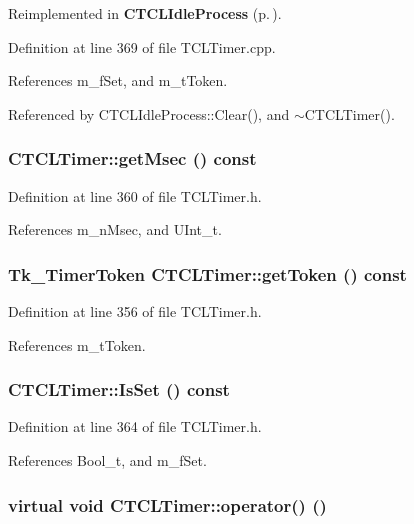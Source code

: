 Reimplemented in {\bf CTCLIdle\-Process} {\rm (p.\,\pageref{classCTCLIdleProcess_a5})}.

Definition at line 369 of file TCLTimer.cpp.

References m\_\-f\-Set, and m\_\-t\-Token.

Referenced by CTCLIdle\-Process::Clear(), and $\sim$CTCLTimer().
\subsubsection{ CTCLTimer::get\-Msec () const\hspace{0.3cm}{\tt  [inline]}}\label{classCTCLTimer_a4}




Definition at line 360 of file TCLTimer.h.

References m\_\-n\-Msec, and UInt\_\-t.
\subsubsection{\setlength{\rightskip}{0pt plus 5cm}Tk\_\-Timer\-Token CTCLTimer::get\-Token () const\hspace{0.3cm}{\tt  [inline]}}\label{classCTCLTimer_a3}




Definition at line 356 of file TCLTimer.h.

References m\_\-t\-Token.
\subsubsection{ CTCLTimer::Is\-Set () const\hspace{0.3cm}{\tt  [inline]}}\label{classCTCLTimer_a5}




Definition at line 364 of file TCLTimer.h.

References Bool\_\-t, and m\_\-f\-Set.
\subsubsection{\setlength{\rightskip}{0pt plus 5cm}virtual void CTCLTimer::operator() ()\hspace{0.3cm}{\tt  [pure virtual]}}\label{classCTCLTimer_a6}




